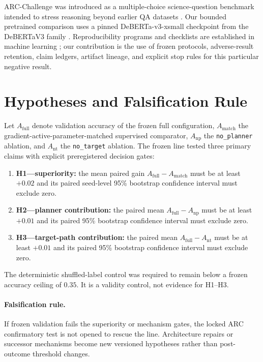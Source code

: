 \documentclass{article}
\begin{document}
ARC-Challenge was introduced as a multiple-choice science-question benchmark intended to stress reasoning beyond earlier QA datasets \citep{clark2018arc}. Our bounded pretrained comparison uses a pinned DeBERTa-v3-xsmall checkpoint from the DeBERTaV3 family \citep{he2023debertav3}. Reproducibility programs and checklists are established in machine learning \citep{pineau2021reproducibility}; our contribution is the use of frozen protocols, adverse-result retention, claim ledgers, artifact lineage, and explicit stop rules for this particular negative result.

\section{Hypotheses and Falsification Rule}
Let $A_{\mathrm{full}}$ denote validation accuracy of the frozen full configuration, $A_{\mathrm{match}}$ the gradient-active-parameter-matched supervised comparator, $A_{\mathrm{np}}$ the \texttt{no\_planner} ablation, and $A_{\mathrm{nt}}$ the \texttt{no\_target} ablation. The frozen line tested three primary claims with explicit preregistered decision gates:
\begin{enumerate}[leftmargin=*]
    \item \textbf{H1---superiority:} the mean paired gain $A_{\mathrm{full}}-A_{\mathrm{match}}$ must be at least $+0.02$ and its paired seed-level 95\% bootstrap confidence interval must exclude zero.
    \item \textbf{H2---planner contribution:} the paired mean $A_{\mathrm{full}}-A_{\mathrm{np}}$ must be at least $+0.01$ and its paired 95\% bootstrap confidence interval must exclude zero.
    \item \textbf{H3---target-path contribution:} the paired mean $A_{\mathrm{full}}-A_{\mathrm{nt}}$ must be at least $+0.01$ and its paired 95\% bootstrap confidence interval must exclude zero.
\end{enumerate}
The deterministic shuffled-label control was required to remain below a frozen accuracy ceiling of $0.35$. It is a validity control, not evidence for H1--H3.

\paragraph{Falsification rule.} If frozen validation fails the superiority or mechanism gates, the locked ARC confirmatory test is not opened to rescue the line. Architecture repairs or successor mechanisms become new versioned hypotheses rather than post-outcome threshold changes.
\end{document}
